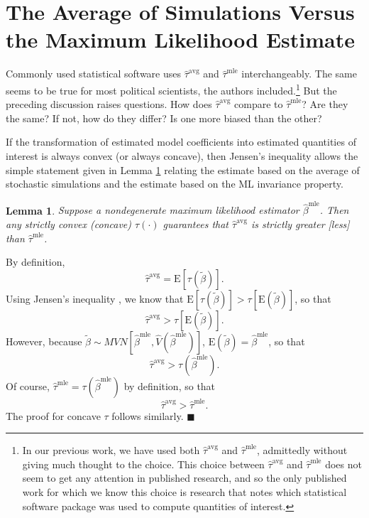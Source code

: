 \documentclass[11pt]{article}
\newtheorem{lemma}{Lemma}
\newenvironment{proof}[1][Proof]{\begin{trivlist}
\item[\hskip \labelsep {\bfseries #1}]}{\end{trivlist}}
\begin{document}
\section*{The Average of Simulations Versus the Maximum Likelihood Estimate}

Commonly used statistical software uses $\hat{\tau}^\text{avg}$ and $\hat{\tau}^\text{mle}$ interchangeably.
The same seems to be true for most political scientists, the authors included.\footnote{In our previous work, we have used both $\hat{\tau}^\text{avg}$ and $\hat{\tau}^\text{mle}$, admittedly without giving much thought to the choice.
This choice between $\hat{\tau}^\text{avg}$ and $\hat{\tau}^\text{mle}$ does not seem to get any attention in published research, and so the only published work for which we know this choice is research that notes which statistical software package was used to compute quantities of interest.} But the preceding discussion raises questions.
How does $\hat{\tau}^\text{avg}$ compare to $\hat{\tau}^{\text{mle}}$? Are they the same? If not, how do they differ? Is one more biased than the other?

If the transformation of estimated model coefficients into estimated quantities of interest is always convex (or always concave), then Jensen's inequality allows the simple statement given in Lemma \ref{lem:direction} relating the estimate based on the average of stochastic simulations and the estimate based on the ML invariance property.

\begin{lemma}\label{lem:direction}
Suppose a nondegenerate maximum likelihood estimator $\hat{\beta}^\text{mle}$.
Then any strictly convex (concave) $\tau(\cdot)$ guarantees that $\hat{\tau}^{\text{avg}}$ is strictly greater [less] than $\hat{\tau}^\text{mle}$.
\end{lemma}
\begin{proof}
By definition, $$ \hat{\tau}^{\text{avg}} = \text{E}\left[ \tau \left(\tilde{\beta} \right) \right].$$
Using Jensen's inequality \citep[p. 190, Thm. 4.7.7]{CasellaBerger2002}, we know that $\text{E}\left[ \tau \left(\tilde{\beta} \right) \right] > \tau \left[ \text{E}\left( \tilde{\beta} \right) \right]$, so that $$\hat{\tau}^{\text{avg}} > \tau \left[ \text{E}\left( \tilde{\beta} \right) \right].$$
However, because $\tilde{\beta} \sim MVN \left[ \hat{\beta}^{\text{mle}}, \hat{V} \left( \hat{\beta}^{\text{mle}} \right) \right]$, $\text{E}\left( \tilde{\beta} \right) = \hat{\beta}^\text{mle}$, so that
$$\hat{\tau}^{\text{avg}} > \tau \left( \hat{\beta}^\text{mle}\right).$$
Of course, $\hat{\tau}^\text{mle} = \tau \left( {\hat{\beta}^\text{mle}} \right)$ by definition, so that $$\hat{\tau}^{\text{avg}} > \hat{\tau}^\text{mle}.$$
The proof for concave $\tau$ follows similarly.
 $\blacksquare$
\end{proof}
\end{document}
